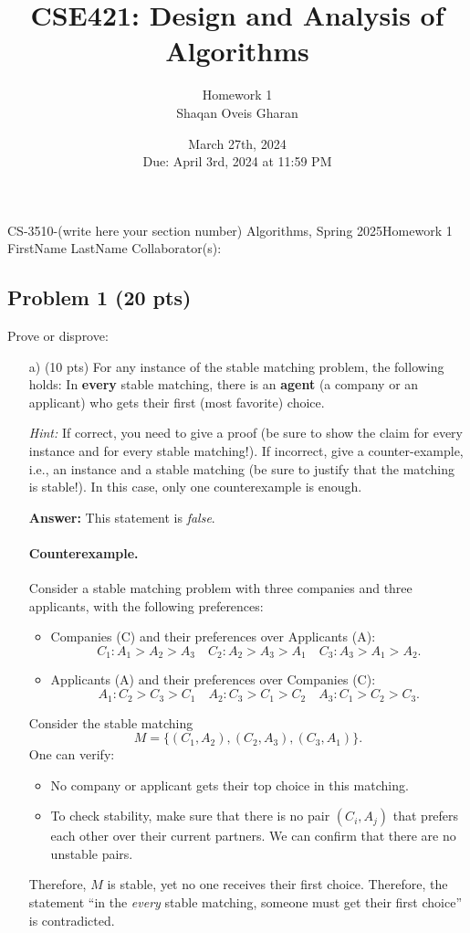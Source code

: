\documentclass[12pt]{article}
\title{\textbf{CSE421: Design and Analysis of Algorithms}}
\author{Homework 1 \\ Shaqan Oveis Gharan}
\date{March 27th, 2024 \\ Due: April 3rd, 2024 at 11:59 PM}
\begin{document}
\noindent CS-3510-(write here your section number) Algorithms, Spring 2025\hfill Homework 1\\
FirstName LastName \hfill Collaborator(s):

\hrulefill

\subsection*{Problem 1 (20 pts)}

Prove or disprove:

\begin{enumerate}
    \item[a)] (10 pts) For any instance of the stable matching problem, the following holds: In \textbf{every} stable matching, there is an \textbf{agent} (a company or an applicant) who gets their first (most favorite) choice. 
    
    \textit{Hint:} If correct, you need to give a proof (be sure to show the claim for every instance and for every stable matching!). If incorrect, give a counter-example, i.e., an instance and a stable matching (be sure to justify that the matching is stable!). In this case, only one counterexample is enough.

    \noindent \textbf{Answer:} 
This statement is \emph{false}.

\paragraph{Counterexample.} 
Consider a stable matching problem with three companies and three applicants, with the following preferences:

\begin{itemize}
    \item Companies (C) and their preferences over Applicants (A):
    \[
    C_1: A_1 > A_2 > A_3 \quad
    C_2: A_2 > A_3 > A_1 \quad
    C_3: A_3 > A_1 > A_2.
    \]
    \item Applicants (A) and their preferences over Companies (C):
    \[
    A_1: C_2 > C_3 > C_1 \quad
    A_2: C_3 > C_1 > C_2 \quad
    A_3: C_1 > C_2 > C_3.
    \]
\end{itemize}

Consider the stable matching 
\[
M = \bigl\{(C_1, A_2), (C_2, A_3), (C_3, A_1)\bigr\}.
\]
One can verify:
\begin{itemize}
    \item No company or applicant gets their top choice in this matching.
    \item To check stability, make sure that there is no pair $(C_i, A_j)$ that prefers each other over their current partners. We can confirm that there are no unstable pairs.
\end{itemize}
Therefore, $M$ is stable, yet no one receives their first choice. 
Therefore, the statement ``in the \emph{every} stable matching, someone must get their first choice'' is contradicted.


\end{enumerate}
\end{document}
